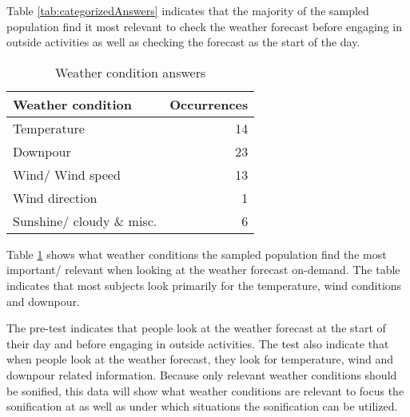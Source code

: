 Table \ref{tab:categorizedAnswers} indicates that the majority of the sampled population find it most relevant to check the weather forecast before engaging in outside activities as well as checking the forecast as the start of the day.

\begin{table}[!htbp]
    \centering
    \begin{tabular}{| l | r |}
        \hline
        \textbf{Weather condition} & \textbf{Occurrences} \\
        \hline
        Temperature & 14 \\
        Downpour & 23 \\
        Wind/ Wind speed & 13 \\
        Wind direction & 1 \\
        Sunshine/ cloudy \& misc. & 6 \\
        \hline
    \end{tabular}
    \caption{Weather condition answers} \label{tab:weatherConditions}
\end{table}

Table \ref{tab:weatherConditions} shows what weather conditions the sampled population find the most important/ relevant when looking at the weather forecast on-demand.
The table indicates that most subjects look primarily for the temperature, wind conditions and downpour.
\bigskip

The pre-test indicates that people look at the weather forecast at the start of their day and before engaging in outside activities.
The test also indicate that when people look at the weather forecast, they look for temperature, wind and downpour related information.
Because only relevant weather conditions should be sonified, this data will show what weather conditions are relevant to focus the sonification at as well as under which situations the sonification can be utilized.
